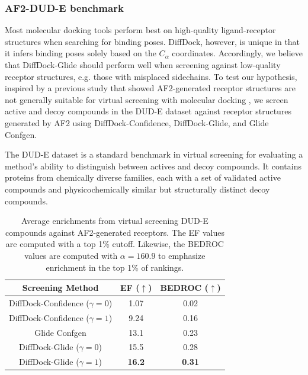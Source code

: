 \documentclass[%
 aip,
 amsmath,amssymb,
reprint,%
]{revtex4-1}
\begin{document}
\subsubsection{AF2-DUD-E benchmark}

Most molecular docking tools perform best on high-quality ligand-receptor structures when searching for binding poses. DiffDock, however, is unique in that it infers binding poses solely based on the $C_\alpha$ coordinates. Accordingly, we believe that DiffDock-Glide should perform well when screening against low-quality receptor structures, e.g. those with misplaced sidechains. To test our hypothesis, inspired by a previous study that showed AF2-generated receptor structures are not generally suitable for virtual screening with molecular docking \cite{zhang2023benchmarking}, we screen active and decoy compounds in the DUD-E dataset against receptor structures generated by AF2 using DiffDock-Confidence, DiffDock-Glide, and Glide Confgen.

The DUD-E dataset is a standard benchmark in virtual screening for evaluating a method's ability to distinguish between actives and decoy compounds.\cite{mysinger2012dude} It contains proteins from chemically diverse families, each with a set of validated active compounds and physicochemically similar but structurally distinct decoy compounds.


\begin{table}[h]
    \centering
    \begin{tabular}{|c||c|c|}
        \hline
        Screening Method & EF ($\uparrow$) & BEDROC ($\uparrow$) \\
        \hline
        \hline
        DiffDock-Confidence ($\gamma=0$) & 1.07 & 0.02 \\
        \hline
        DiffDock-Confidence ($\gamma=1$) & 9.24 & 0.16 \\
        \hline
        Glide Confgen & 13.1 & 0.23 \\
        \hline
        DiffDock-Glide ($\gamma=0$) & 15.5 & 0.28 \\
        \hline
        DiffDock-Glide ($\gamma=1$) & \textbf{16.2} & \textbf{0.31} \\
        \hline
    \end{tabular}
    \caption{Average enrichments from virtual screening DUD-E compounds against AF2-generated receptors. The EF values are computed with a top 1\% cutoff. Likewise, the BEDROC values are computed with $\alpha=160.9$ to emphasize enrichment in the top 1\% of rankings.}
    \label{table:enrichment}
\end{table}
\end{document}
